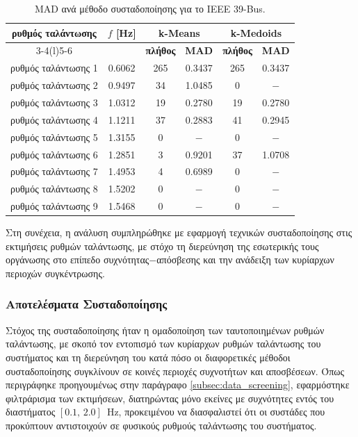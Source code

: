 \begin{table}[!t]
\centering
\caption{MAD ανά μέθοδο συσταδοποίησης για το IEEE 39-Bus.}
\label{tab:mad_summary_ieee39}
\begin{tabular}{cccccc}
\toprule
\textbf{ρυθμός ταλάντωσης} & \textbf{$f$ [Hz]} & \multicolumn{2}{c}{\textbf{k-Means}} & \multicolumn{2}{c}{\textbf{k-Medoids}} \\
\cmidrule(lr){3-4}\cmidrule(l){5-6}
 & & \textbf{πλήθος} & \textbf{MAD} & \textbf{πλήθος} & \textbf{MAD} \\
\midrule
ρυθμός ταλάντωσης 1 & 0.6062 & 265 & 0.3437 & 265 & 0.3437 \\
ρυθμός ταλάντωσης 2 & 0.9497 & 34  & 1.0485 & 0   & $-$     \\
ρυθμός ταλάντωσης 3 & 1.0312 & 19  & 0.2780 & 19  & 0.2780 \\
ρυθμός ταλάντωσης 4 & 1.1211 & 37  & 0.2883 & 41  & 0.2945 \\
ρυθμός ταλάντωσης 5 & 1.3155 & 0   & $-$     & 0   & $-$     \\
ρυθμός ταλάντωσης 6 & 1.2851 & 3   & 0.9201 & 37  & 1.0708 \\
ρυθμός ταλάντωσης 7 & 1.4953 & 4   & 0.6989 & 0   & $-$     \\
ρυθμός ταλάντωσης 8 & 1.5202 & 0   & $-$     & 0   & $-$     \\
ρυθμός ταλάντωσης 9 & 1.5468 & 0   & $-$     & 0   & $-$     \\
\bottomrule
\end{tabular}
\end{table}
\fi

Στη συνέχεια, η ανάλυση συμπληρώθηκε με εφαρμογή τεχνικών συσταδοποίησης στις
εκτιμήσεις ρυθμών ταλάντωσης, με στόχο τη διερεύνηση της εσωτερικής τους οργάνωσης στο επίπεδο
συχνότητας$-$απόσβεσης και την ανάδειξη των κυρίαρχων περιοχών συγκέντρωσης.


\subsubsection{Αποτελέσματα Συσταδοποίησης}
\ifkundursystemanalysis
\label{sec:kundur-clustering-results}
Στόχος της συσταδοποίησης ήταν η ομαδοποίηση των ταυτοποιημένων ρυθμών ταλάντωσης, με σκοπό τον εντοπισμό των κυρίαρχων ρυθμών ταλάντωσης του συστήματος και τη διερεύνηση του κατά πόσο οι διαφορετικές μέθοδοι συσταδοποίησης συγκλίνουν σε κοινές περιοχές συχνοτήτων και αποσβέσεων. Όπως περιγράφηκε προηγουμένως στην παράγραφο \ref{subsec:data_screening}, εφαρμόστηκε φιλτράρισμα των εκτιμήσεων, διατηρώντας μόνο εκείνες με συχνότητες εντός του διαστήματος $[0.1,\,2.0]$~Hz, προκειμένου να διασφαλιστεί ότι οι συστάδες που προκύπτουν αντιστοιχούν σε φυσικούς ρυθμούς ταλάντωσης του συστήματος.

